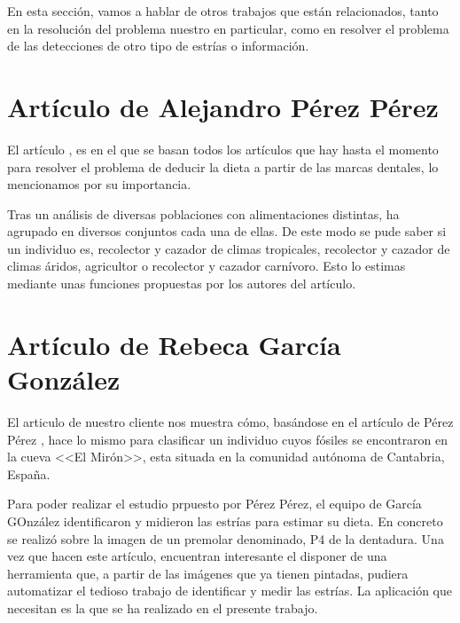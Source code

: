 
En esta sección, vamos a hablar de otros trabajos que están relacionados, tanto en la resolución del problema nuestro en particular, como en resolver el problema de las detecciones de otro tipo de estrías o información.

\section{Artículo de Alejandro Pérez Pérez}
El artículo \cite{Lalueza:perez}, es en el que se basan todos los artículos que hay hasta el momento para resolver el problema de deducir la dieta a partir de las marcas dentales, lo mencionamos por su importancia.

Tras un análisis de diversas poblaciones con alimentaciones distintas, ha agrupado en diversos conjuntos cada una de ellas. De este modo se pude saber si un individuo es, recolector y cazador de climas tropicales, recolector y cazador de climas áridos, agricultor o recolector y cazador carnívoro.
Esto lo estimas mediante unas funciones propuestas por los autores del artículo.

\section{Artículo de Rebeca García González}
El articulo \cite{garcia2015dietary} de nuestro cliente nos muestra cómo, basándose en el artículo de Pérez Pérez \cite{Lalueza:perez}, hace lo mismo para clasificar un individuo cuyos fósiles se encontraron en la cueva <<El Mirón>>, esta situada en la comunidad autónoma de Cantabria, España.

Para poder realizar el estudio prpuesto por Pérez Pérez, el equipo de García GOnzález identificaron y midieron las estrías para estimar su dieta. En concreto se realizó sobre la imagen de un premolar denominado, P4 de la dentadura. 
Una vez que hacen este artículo, encuentran interesante el disponer de una herramienta que, a partir de las imágenes que ya tienen pintadas, pudiera automatizar el tedioso trabajo de identificar y medir las estrías. La aplicación que necesitan es la que se ha realizado en el presente trabajo.

